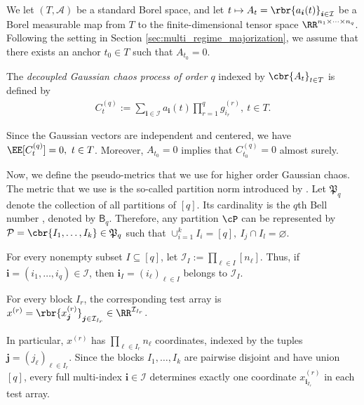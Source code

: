 \documentclass[11pt]{article}
\begin{document}
We let $(T,\mathcal A)$ be a standard Borel space, and let $t
\mapsto A_t=\rbr{a_{\boldsymbol i}(t)}_{\boldsymbol i\in\mathcal I}$ be a Borel measurable map from $T$ to the finite-dimensional tensor
space $\RR^{n_1\times\cdots\times n_q}$. Following the setting in Section \ref{sec:multi_regime_majorization}, we assume that there exists an
anchor $t_0\in T$ such that $A_{t_0}=0$.

\begin{definition}
\label{def:higher_order_gaussian_chaos}
The \emph{decoupled Gaussian chaos process of order $q$} indexed by
$\cbr{A_t}_{t\in T}$ is defined by
\begin{align}
C_t^{(q)}
:=
\sum_{\boldsymbol i\in\mathcal I}
a_{\boldsymbol i}(t)
\prod_{r=1}^qg^{(r)}_{i_r},
\ t\in T.
\label{eq:higher_order_gaussian_chaos_definition}
\end{align}
\end{definition}

Since the Gaussian vectors are independent and centered, we have
$\EE[C_t^{(q)}]=0,
\ t\in T$. Moreover, $A_{t_0}=0$ implies that
$C_{t_0}^{(q)}=0$ almost surely.

Now, we define the pseudo-metrics that we use for higher order Gaussian chaos. The metric that we use is the so-called partition norm introduced by \citet{latala2006estimates}. Let $\mathfrak P_q$ denote the collection of all partitions of $[q]$.
Its cardinality is the $q$th Bell number \citep{bell1938iterated}, denoted by $\mathsf B_q$. Therefore, any partition $\cP$ can be represented by $\mathcal P=\cbr{I_1,\ldots,I_k}\in\mathfrak P_q$ such that
$\cup_{i=1}^kI_i=[q],\ I_j\cap I_l=\varnothing$.

For every nonempty subset
$I\subseteq[q]$, let $\mathcal I_I
:=
\prod_{\ell\in I}[n_\ell]$. Thus, if
$\boldsymbol i=(i_1,\ldots,i_q)\in\mathcal I$, then
$\boldsymbol i_I=(i_\ell)_{\ell\in I}$ belongs to $\mathcal I_I$.



For every block $I_r$, the corresponding test array is $x^{(r)}
=
\rbr{x^{(r)}_{\boldsymbol j}}_{\boldsymbol j\in\mathcal I_{I_r}}
\in
\RR^{\mathcal I_{I_r}}$.

In particular, $x^{(r)}$ has
$\prod_{\ell\in I_r}n_\ell$ coordinates, indexed by the tuples
$\boldsymbol j=(j_\ell)_{\ell\in I_r}$. Since the blocks
$I_1,\ldots,I_k$ are pairwise disjoint and have union $[q]$, every full
multi-index $\boldsymbol i\in\mathcal I$ determines exactly one
coordinate $x^{(r)}_{\boldsymbol i_{I_r}}$ in each test array.
\end{document}
